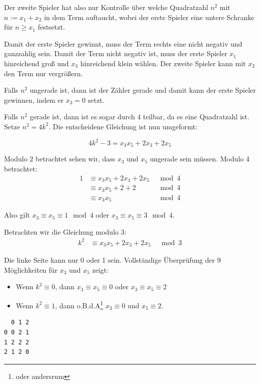\documentclass[../main.tex]{subfiles}
\begin{document}

Der zweite Spieler hat also nur Kontrolle über welche Quadratzahl $n^2$ mit $n := x_1 + x_2$ in dem Term auftaucht, wobei der erste Spieler eine untere Schranke für $n \geq x_1$ festsetzt.

Damit der erste Spieler gewinnt, muss der Term rechts eine nicht negativ und ganzzahlig sein. Damit der Term nicht negativ ist, muss der erste Spieler $x_1$ hinreichend groß und $x_3$ hinreichend klein wählen. Der zweite Spieler kann mit $x_2$ den Term nur vergrößern.

Falls $n^2$ ungerade ist, dann ist der Zähler gerade und damit kann der erste Spieler gewinnen, indem er $x_3 = 0$ setzt.

Falls $n^2$ gerade ist, dann ist es sogar durch 4 teilbar, da es eine Quadratzahl ist. Setze $n^2 = 4k^2$. Die entscheidene Gleichung ist nun umgeformt:

\begin{equation*}
    4k^2 - 3 = x_3x_5 + 2x_3 + 2x_5
\end{equation*}

Modulo 2 betrachtet sehen wir, dass $x_3$ und $x_5$ ungerade sein müssen. Modulo 4 betrachtet:
\begin{align*}
  1 &\equiv x_3x_5 + 2x_3 + 2x_5 &\mod 4 \\
    &\equiv x_3x_5 + 2 + 2 &\mod 4 \\
    &\equiv x_3x_5 &\mod 4
\end{align*}

Also gilt $x_3 \equiv x_5 \equiv 1 \mod 4$ oder $x_3 \equiv x_5 \equiv 3 \mod 4$.

Betrachten wir die Gleichung modulo 3:
\begin{align*}
    k^2 &\equiv x_3x_5 + 2x_3 + 2x_5 &\mod 3
\end{align*}

Die linke Seite kann nur 0 oder 1 sein. Vollständige Überprüfung der 9 Möglichkeiten für $x_3$ und $x_5$ zeigt:
\begin{itemize}
    \item Wenn $k^2 \equiv 0$, dann $x_3 \equiv x_5 \equiv 0$ oder $x_3 \equiv x_5 \equiv 2$
    \item Wenn $k^2 \equiv 1$, dann o.B.d.A\footnote{oder andersrum} $x_3 \equiv 0$ und $x_5 \equiv 2$.
\end{itemize} 

\begin{verbatim}    
  0 1 2
0 0 2 1
1 2 2 2
2 1 2 0
\end{verbatim}
\end{document}
